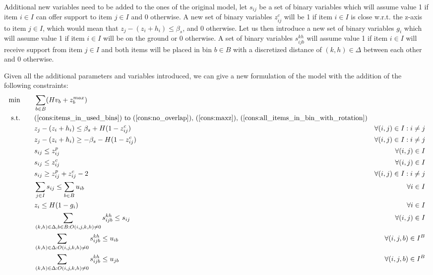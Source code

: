 Additional new variables need to be added to the ones of the original model, let $s_{ij}$ be a set of binary variables which will assume value 1 if item $i \in I$ can offer support to item $j \in I$ and 0 otherwise. A new set of binary variables $z^c_{ij}$ will be 1 if item $i \in I$ is close w.r.t. the z-axis to item $j \in I$, which would mean that $z_j - (z_i + h_i) \le \beta_s$, and 0 otherwise.
Let us then introduce a new set of binary variables $g_i$ which will assume value 1 if item $i \in I$ will be on the ground or 0 otherwise. A set of binary variables $s^{kh}_{i j b}$ will assume value 1 if item $i \in I$ will receive support from item $j \in I$ and both items will be placed in bin $b \in B$ with a discretized distance of $(k, h) \in \Delta$ between each other and 0 otherwise.

Given all the additional parameters and variables introduced, we can give a new formulation of the model with the addition of the following constraints:
\label{par:support_const}
\begin{align}
    \min       \qquad   & \sum\limits_{b \in B} (H v_b + z^{max}_b) \notag \\
    \text{s.t.} \qquad  & \text{(\ref{cons:items_in_used_bins}) to (\ref{cons:no_overlap}), (\ref{cons:maxz}), (\ref{cons:all_items_in_bin_with_rotation})} \notag \\ 
                        & z_j - (z_i + h_i) \le \beta_s + H (1 - z^c_{ij}) & \forall (i, j) \in I : i \neq j \label{cons:z_close_1} \\
                        & z_j - (z_i + h_i) \ge -\beta_s - H (1 - z^c_{ij}) & \forall (i, j) \in I : i \neq j \label{cons:z_close_2} \\
                        & s_{ij} \le z^p_{ij} & \forall (i, j) \in I  \label{cons:supporting_1} \\
                        & s_{ij} \le z^c_{ij} & \forall (i, j) \in I  \label{cons:supporting_2} \\
                        & s_{ij} \ge z^p_{ij} + z^c_{ij} - 2 & \forall (i, j) \in I : i \neq j \label{cons:supporting} \\
                        & \sum\limits_{j \in I}{s_{ij}} \le \sum\limits_{b \in B}{u_{ib}} & \forall i \in I  \label{cons:support_comes_from_placed} \\
                        & z_i \le H(1 - g_i) & \forall i \in I \label{cons:grounded} \\
                        & \sum\limits_{(k, h) \in \Delta, b \in B : O(i, j, k, h) \neq 0} s^{k h}_{i j b} \le s_{ij} & \forall (i, j) \in I \label{cons:discretized_support_same} \\
                        & \sum\limits_{(k, h) \in \Delta : O(i, j, k, h) \neq 0} s^{k h}_{i j b} \le u_{ib} & \forall (i, j, b) \in I^B \label{cons:discretized_support_right_bin_i} \\
                        & \sum\limits_{(k, h) \in \Delta : O(i, j, k, h) \neq 0} s^{k h}_{i j b} \le u_{jb} & \forall (i, j, b) \in I^B \label{cons:discretized_support_right_bin_j}
\end{align}
